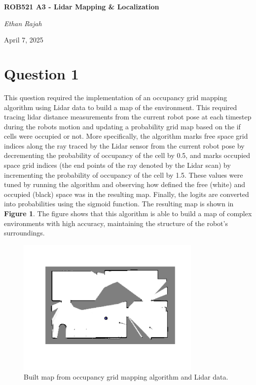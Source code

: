 \documentclass{article}
\begin{document}
\begin{titlepage}
\centering
	\vspace*{\fill}
	{\huge\bfseries ROB521 A3 - Lidar Mapping \& Localization\par}
	\vspace{7cm}
	{\Large\itshape Ethan Rajah\par}
	{\Large April 7, 2025\par}
	\vspace*{\fill}
\end{titlepage}

\newpage
\section{Question 1}
This question required the implementation of an occupancy grid mapping algorithm using Lidar data to build a map of the environment.
This required tracing lidar distance measurements from the current robot pose at each timestep during the robots motion and updating a probability grid map based on the
if cells were occupied or not. More specifically, the algorithm marks free space grid indices along the ray traced by the Lidar sensor from the current robot pose by decrementing
the probability of occupancy of the cell by 0.5, and marks occupied space grid indices (the end points of the ray denoted by the Lidar scan) by incrementing the probability of occupancy of the cell by 1.5.
These values were tuned by running the algorithm and observing how defined the free (white) and occupied (black) space was in the resulting map.
Finally, the logits are converted into probabilities using the sigmoid function. The resulting map is shown in \textbf{Figure 1}.
The figure shows that this algorithm is able to build a map of complex environments with high accuracy, maintaining the structure of the robot's surroundings.

\begin{figure}[h!]
    \centering
    \includegraphics[width=0.8\textwidth]{ass2_q1.png}
    \caption{Built map from occupancy grid mapping algorithm and Lidar data.}
\end{figure}
\end{document}
